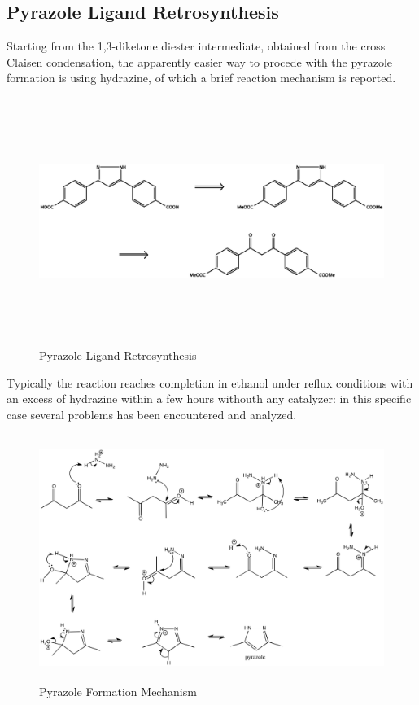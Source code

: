 \documentclass[../Master.tex]{subfiles}
\begin{document}
\subsection{Pyrazole Ligand Retrosynthesis}\label{sec:pyrazole-reaction}
Starting from the 1,3-diketone diester intermediate, obtained from the cross Claisen condensation, the apparently easier way to procede with the pyrazole formation is using hydrazine, of which a brief reaction mechanism is reported.

\begin{figure}[h!]
	\centering
	\includegraphics[width=16cm,height=8cm,keepaspectratio]{Structures/pyrazole-retro.eps}
	\caption{Pyrazole Ligand Retrosynthesis}\label{fig:pyrazole-retro}
\end{figure}
Typically the reaction reaches completion in ethanol under reflux conditions with an excess of hydrazine within a few hours withouth any catalyzer: in this specific case several problems has been encountered and analyzed.\\

\begin{figure}[h!]
	\centering
	\includegraphics[width=16cm,height=8cm,keepaspectratio]{Images/pyrazole-mechanism.png}
	\caption{Pyrazole Formation Mechanism}
\end{figure}
\end{document}
